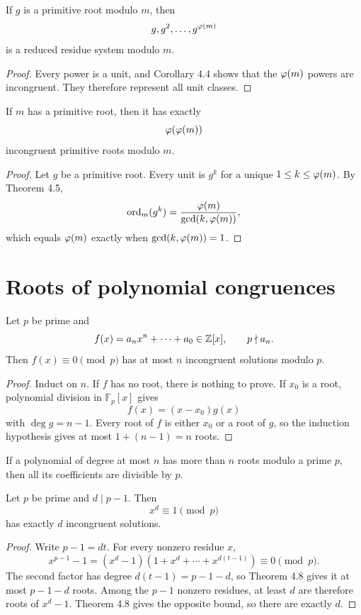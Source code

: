 \begin{thm}
If $g$ is a primitive root modulo $m$, then
\[
 g,g^2,\ldots,g^{\varphi(m)}
\]
is a reduced residue system modulo $m$.
\end{thm}
\begin{proof}
Every power is a unit, and Corollary 4.4 shows that the $\varphi(m)$ powers are incongruent.  They therefore represent all unit classes.
\end{proof}

\begin{thm}
If $m$ has a primitive root, then it has exactly
\[
 \varphi(\varphi(m))
\]
incongruent primitive roots modulo $m$.
\end{thm}
\begin{proof}
Let $g$ be a primitive root.  Every unit is $g^k$ for a unique $1\le k\le\varphi(m)$.  By Theorem 4.5,
\[
 \operatorname{ord}_m(g^k)=\frac{\varphi(m)}{\gcd(k,\varphi(m))},
\]
which equals $\varphi(m)$ exactly when $\gcd(k,\varphi(m))=1$.
\end{proof}

\section{Roots of polynomial congruences}

\begin{thm}
Let $p$ be prime and
\[
 f(x)=a_nx^n+\cdots+a_0\in\mathbb{Z}[x],
 \qquad p\nmid a_n.
\]
Then $f(x)\equiv0\pmod p$ has at most $n$ incongruent solutions modulo $p$.
\end{thm}
\begin{proof}
Induct on $n$.  If $f$ has no root, there is nothing to prove.  If $x_0$ is a root, polynomial division in $\mathbb{F}_p[x]$ gives
\[
 f(x)=(x-x_0)g(x)
\]
with $\deg g=n-1$.  Every root of $f$ is either $x_0$ or a root of $g$, so the induction hypothesis gives at most $1+(n-1)=n$ roots.
\end{proof}

\begin{cor}
If a polynomial of degree at most $n$ has more than $n$ roots modulo a prime $p$, then all its coefficients are divisible by $p$.
\end{cor}

\begin{thm}
Let $p$ be prime and $d\mid p-1$.  Then
\[
 x^d\equiv1\pmod p
\]
has exactly $d$ incongruent solutions.
\end{thm}
\begin{proof}
Write $p-1=dt$.  For every nonzero residue $x$,
\[
 x^{p-1}-1=(x^d-1)(1+x^d+\cdots+x^{d(t-1)})\equiv0\pmod p.
\]
The second factor has degree $d(t-1)=p-1-d$, so Theorem 4.8 gives it at most $p-1-d$ roots.  Among the $p-1$ nonzero residues, at least $d$ are therefore roots of $x^d-1$.  Theorem 4.8 gives the opposite bound, so there are exactly $d$.
\end{proof}

